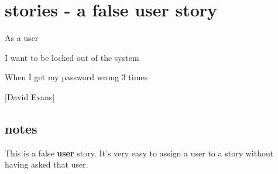 \section*{stories - a false user story}
As a user

I want to be locked out of the system

When I get my password wrong 3 times

[David Evans]

\subsection*{notes}
This is a false \textbf{user} story. It's very easy to assign a user to a story without having asked that user.